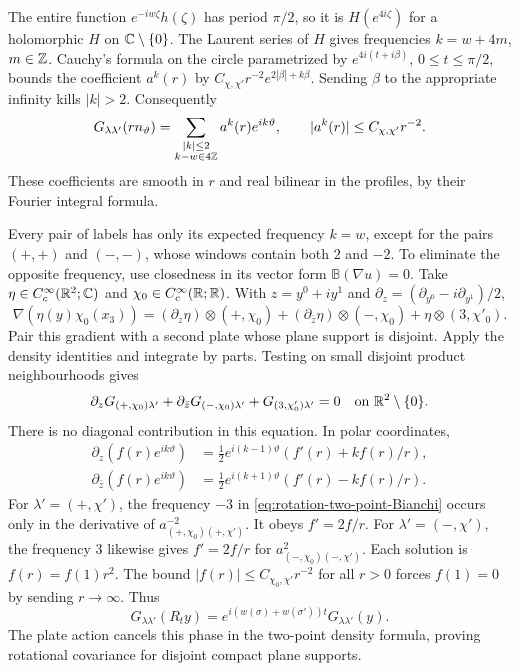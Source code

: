 The entire function $e^{-iw\zeta}h(\zeta)$ has period $\pi/2$,
so it is $H(e^{4i\zeta})$ for a holomorphic $H$ on
$\mathbb C\setminus\{0\}$. The Laurent series of $H$ gives
frequencies $k=w+4m$, $m\in\mathbb Z$. Cauchy's formula on the circle
parametrized by $e^{4i(t+i\beta)}$, $0\le t\le\pi/2$,
bounds the coefficient $a^k(r)$ by
$C_{\chi,\chi'}r^{-2}e^{2|\beta|+k\beta}$.
Sending $\beta$ to the appropriate infinity kills $|k|>2$.
Consequently
\begin{equation}\label{eq:rotation-two-point-window}
 G_{\lambda\lambda'}(rn_\vartheta)
   =\sum_{\substack{|k|\le2\\k-w\in4\mathbb Z}}a^k(r)e^{ik\vartheta},
 \qquad |a^k(r)|\le C_{\chi,\chi'}r^{-2}.
\end{equation}
These coefficients are smooth in $r$ and real bilinear in the
profiles, by their Fourier integral formula.

Every pair of labels has only its expected frequency $k=w$,
except for the pairs $(+,+)$ and $(-,-)$, whose windows contain
both $2$ and $-2$. To eliminate the opposite frequency, use
closedness in its vector form $\mathbb B(\nabla u)=0$.
Take $\eta\in C_c^\infty(\mathbb R^2;\mathbb C)$ and
$\chi_0\in C_c^\infty(\mathbb R;\mathbb R)$. With $z=y^0+iy^1$ and
$\partial_z=(\partial_{y^0}-i\partial_{y^1})/2$,
\[
 \nabla(\eta(y)\chi_0(x_3))
   =(\partial_z\eta)\otimes(+,\chi_0)
       +(\partial_{\bar z}\eta)\otimes(-,\chi_0)
       +\eta\otimes(3,\chi'_0).
\]
Pair this gradient with a second plate whose plane support is
disjoint. Apply the density identities and integrate by parts.
Testing on small disjoint product neighbourhoods gives
\begin{equation}\label{eq:rotation-two-point-Bianchi}
 \partial_zG_{(+,\chi_0)\lambda'}
       +\partial_{\bar z}G_{(-,\chi_0)\lambda'}
       +G_{(3,\chi'_0)\lambda'}=0
                       \quad\text{on }\mathbb R^2\setminus\{0\}.
\end{equation}
There is no diagonal contribution in this equation.
In polar coordinates,
\begin{align*}
 \partial_z(f(r)e^{ik\vartheta})
       &=\tfrac12e^{i(k-1)\vartheta}(f'(r)+kf(r)/r),\\
 \partial_{\bar z}(f(r)e^{ik\vartheta})
       &=\tfrac12e^{i(k+1)\vartheta}(f'(r)-kf(r)/r).
\end{align*}
For $\lambda'=(+,\chi')$, the frequency $-3$ in
\eqref{eq:rotation-two-point-Bianchi} occurs only in the derivative
of $a^{-2}_{(+,\chi_0)(+,\chi')}$.
It obeys $f'=2f/r$.
For $\lambda'=(-,\chi')$, the frequency $3$ likewise gives
$f'=2f/r$ for $a^2_{(-,\chi_0)(-,\chi')}$.
Each solution is $f(r)=f(1)r^2$. The bound
$|f(r)|\le C_{\chi_0,\chi'}r^{-2}$ for all $r>0$ forces
$f(1)=0$ by sending $r\to\infty$. Thus
\begin{equation}\label{eq:rotation-two-point-phase}
 G_{\lambda\lambda'}(R_ty)
       =e^{i(w(\sigma)+w(\sigma'))t}G_{\lambda\lambda'}(y).
\end{equation}
The plate action cancels this phase in the two-point density
formula, proving rotational covariance for disjoint compact
plane supports.

